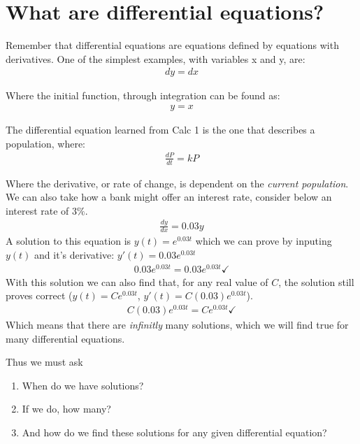 \section{What are differential equations?}

Remember that differential equations are equations defined by equations with derivatives. One of the simplest examples, with variables x and y, are:
\begin{align*}
    dy=dx
\end{align*}

Where the initial function, through integration can be found as:
\begin{align*}
    y=x
\end{align*}

The differential equation learned from Calc 1 is the one that describes a population, where:
\begin{align*}
    \frac{dP}{dt}=kP
\end{align*}

Where the derivative, or rate of change, is dependent on the \emph{current population}. We can also take how a bank might offer an interest rate, consider below an interest rate of $3\%$.
\begin{align*}
    \frac{dy}{dx}=0.03y
\end{align*}
A solution to this equation is $y(t)=e^{0.03t}$ which we can prove by inputing $y(t)$ and it's derivative: $y'(t)=0.03e^{0.03t}$
\begin{align*}
    0.03e^{0.03t} = 0.03e^{0.03t} \checkmark
\end{align*}
With this solution we can also find that, for any real value of $C$, the solution still proves correct ($y(t)=Ce^{0.03t}$, $y'(t)=C(0.03)e^{0.03t}$).
\begin{align*}
    C(0.03)e^{0.03t}=Ce^{0.03t} \checkmark
\end{align*}
Which means that there are \emph{infinitly} many solutions, which we will find true for many differential equations.

Thus we must ask
\begin{enumerate}
    \item When do we have solutions?
    \item If we do, how many?
    \item And how do we find these solutions for any given differential equation?
\end{enumerate}

